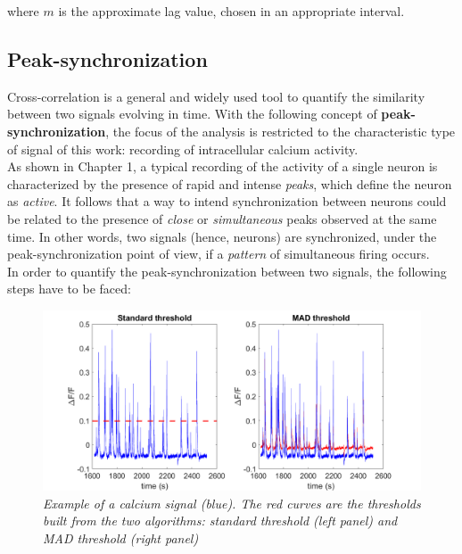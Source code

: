 \documentclass[12pt, a4paper]{article}
\begin{document}
where $m$ is the approximate lag value, chosen in an appropriate interval.



\subsection{Peak-synchronization} \label{section 2.3}

Cross-correlation is a general and widely used tool to quantify the similarity between two signals evolving in time. With the following concept of \textbf{peak-synchronization}, the focus of the analysis is restricted to the characteristic type of signal of this work: recording of intracellular calcium activity.\\
As shown in Chapter 1, a typical recording of the activity of a single neuron is characterized by the presence of rapid and intense \textit{peaks}, which define the neuron as \textit{active}. It follows that a way to intend synchronization between neurons could be related to the presence of \textit{close} or \textit{simultaneous} peaks observed at the same time. In other words, two signals (hence, neurons) are synchronized, under the peak-synchronization point of view, if a \textit{pattern} of simultaneous firing occurs. 
\\

In order to quantify the peak-synchronization between two signals, the following steps have to be faced:

\begin{figure}[H]
	\begin{center}
		\hspace*{-1.5cm}
		\includegraphics[scale=.42]{thresholds.png} 
	\end{center} 
	\caption{\textit{Example of a calcium signal (blue). The red curves are the thresholds built from the two algorithms: standard threshold (left panel) and MAD threshold (right panel)}} \label{threshold}
	
\end{figure}
\end{document}
